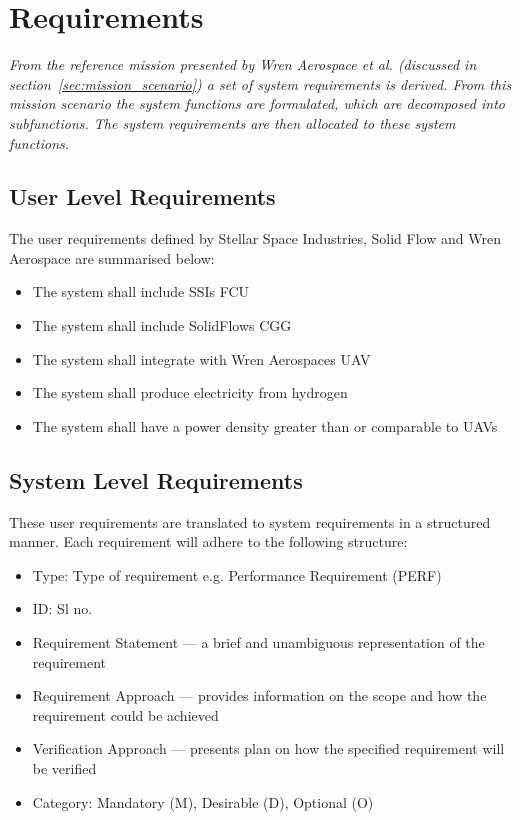 \chapter{Requirements}%
\label{sec:requiements}

\emph{From the reference mission presented by Wren Aerospace et al. (discussed in section~\ref{sec:mission_scenario}) a set of system requirements is derived. From this mission scenario the system functions are formulated, which are decomposed into subfunctions. The system requirements are then allocated to these system functions.}
\newpage

\section{User Level Requirements}

The user requirements defined by Stellar Space Industries, Solid Flow and Wren Aerospace are summarised below:
\begin{itemize}
    \item The system shall include SSIs FCU
    \item The system shall include SolidFlows CGG
    \item The system shall integrate with Wren Aerospaces UAV
    \item The system shall produce electricity from hydrogen
    \item The system shall have a power density greater than or comparable to UAVs %
\end{itemize}

\section{System Level Requirements}
These user requirements are translated to system requirements in a structured manner. Each requirement will adhere to the following structure:


\begin{itemize}
    \item Type: Type of requirement e.g. Performance Requirement (PERF)
    \item ID: Sl no.
    \item Requirement Statement --- a brief and unambiguous representation of the requirement
    \item Requirement Approach --- provides information on the scope and how the requirement could be achieved
    \item Verification Approach --- presents plan on how the specified requirement will be verified
    \item Category: Mandatory (M), Desirable (D), Optional (O)
\end{itemize}

